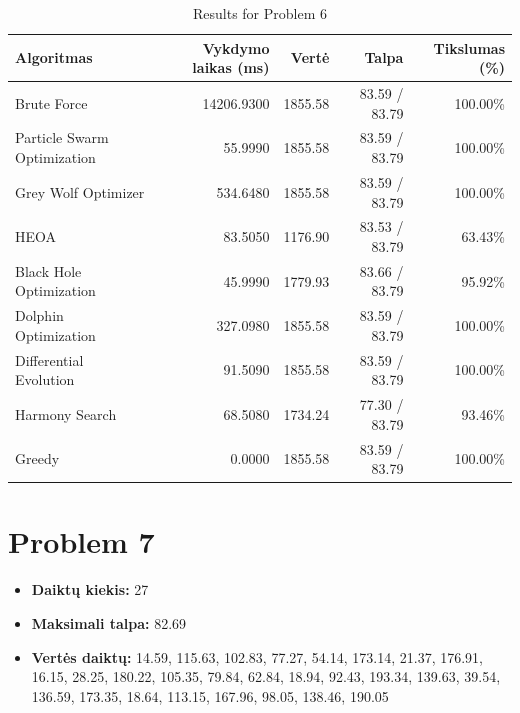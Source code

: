 \documentclass[a4paper,11pt]{article}
\begin{document}
\begin{table}[h!]
\centering
\begin{tabular}{lrrrr}
\toprule
\textbf{Algoritmas} & \textbf{Vykdymo laikas (ms)} & \textbf{Vertė} & \textbf{Talpa} & \textbf{Tikslumas (\%)} \\
\midrule
Brute Force & 14206.9300 & 1855.58 & 83.59 / 83.79 & 100.00\% \\
Particle Swarm Optimization & 55.9990 & 1855.58 & 83.59 / 83.79 & 100.00\% \\
Grey Wolf Optimizer & 534.6480 & 1855.58 & 83.59 / 83.79 & 100.00\% \\
HEOA & 83.5050 & 1176.90 & 83.53 / 83.79 & 63.43\% \\
Black Hole Optimization & 45.9990 & 1779.93 & 83.66 / 83.79 & 95.92\% \\
Dolphin Optimization & 327.0980 & 1855.58 & 83.59 / 83.79 & 100.00\% \\
Differential Evolution & 91.5090 & 1855.58 & 83.59 / 83.79 & 100.00\% \\
Harmony Search & 68.5080 & 1734.24 & 77.30 / 83.79 & 93.46\% \\
Greedy & 0.0000 & 1855.58 & 83.59 / 83.79 & 100.00\% \\
\bottomrule
\end{tabular}
\caption{Results for Problem 6}
\end{table}
\clearpage

\section*{Problem 7}
\begin{itemize}
    \item \textbf{Daiktų kiekis:} 27
    \item \textbf{Maksimali talpa:} 82.69
    \item \textbf{Vertės daiktų:} 14.59, 115.63, 102.83, 77.27, 54.14, 173.14, 21.37, 176.91, 16.15, 28.25, 180.22, 105.35, 79.84, 62.84, 18.94, 92.43, 193.34, 139.63, 39.54, 136.59, 173.35, 18.64, 113.15, 167.96, 98.05, 138.46, 190.05
\end{itemize}
\end{document}
